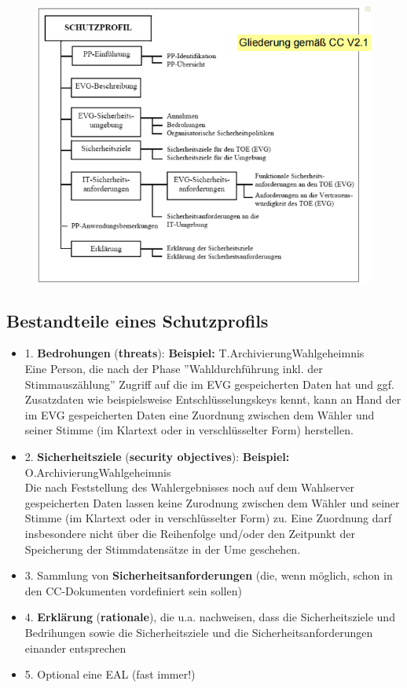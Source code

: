 \documentclass[openany]{book}
\begin{document}
\begin{figure}[h!]
    \centering
    \includegraphics[width=\linewidth]{Pics/ProtectionProfiles.PNG}
\end{figure}

\subsection{Bestandteile eines Schutzprofils}

\begin{itemize}
    \item 1. \textbf{Bedrohungen} (\textbf{threats}): \textbf{Beispiel:} T.ArchivierungWahlgeheimnis \\ Eine Person, die nach der Phase ''Wahldurchführung inkl. der Stimmauszählung'' Zugriff auf die im EVG gespeicherten Daten hat und ggf. Zusatzdaten wie beispielsweise Entschlüsselungskeys kennt, kann an Hand der im EVG gespeicherten Daten eine Zuordnung zwischen dem Wähler und seiner Stimme (im Klartext oder in verschlüsselter Form) herstellen.
    \item 2. \textbf{Sicherheitsziele} (\textbf{security objectives}): \textbf{Beispiel:} O.ArchivierungWahlgeheimnis \\ Die nach Feststellung des Wahlergebnisses noch auf dem Wahlserver gespeicherten Daten lassen keine Zurodnung zwischen dem Wähler und seiner Stimme (im Klartext oder in verschlüsselter Form) zu. Eine Zuordnung darf insbesondere nicht über die Reihenfolge und/oder den Zeitpunkt der Speicherung der Stimmdatensätze in der Ume geschehen.
    \item 3. Sammlung von \textbf{Sicherheitsanforderungen} (die, wenn möglich, schon in den CC-Dokumenten vordefiniert sein sollen)
    \item 4. \textbf{Erklärung} (\textbf{rationale}), die u.a. nachweisen, dass die Sicherheitsziele und Bedrihungen sowie die Sicherheitsziele und die Sicherheitsanforderungen einander entsprechen
    \item 5. Optional eine EAL (fast immer!)
\end{itemize}
\end{document}
